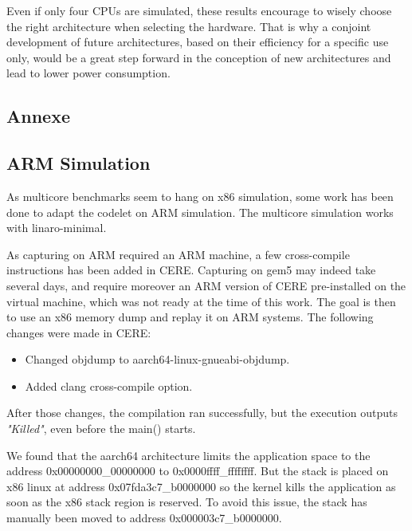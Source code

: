 \documentclass{article}
\begin{document}
\begin{multicols}{2}
Even if only four CPUs are simulated, these results encourage to wisely choose the right architecture when selecting the hardware. That is why a conjoint development of future architectures, based on their efficiency for a specific use only, would be a great step forward in the conception of new architectures and lead to lower power consumption. 


\end{multicols}
\newpage
\begin{multicols}{2}




\end{multicols}
\newpage
\begin{multicols}{2}

\section{Annexe}
\subsection{ARM Simulation}
\label{ARM_sim}
As multicore benchmarks seem to hang on x86 simulation, some work has been done to adapt the codelet on ARM simulation.
The multicore simulation works with linaro-minimal.

As capturing on ARM required an ARM machine, a few cross-compile instructions has been added in CERE. Capturing on gem5 may indeed take several days, and require moreover an ARM version of CERE pre-installed on the virtual machine, which was not ready at the time of this work. The goal is then to use an x86 memory dump and replay it on ARM systems. The following changes were made in CERE:
\begin{itemize}
\item Changed objdump to aarch64-linux-gnueabi-objdump.
\item Added clang cross-compile option.
\end{itemize}

After those changes, the compilation ran successfully, but the execution outputs \textit{"Killed"}, even before the main() starts.


We found that the aarch64 architecture limits the application space to the address 0x00000000\_00000000 to 0x0000ffff\_ffffffff\cite{aarch64-mmu}.
 But the stack is placed on x86 linux at address 0x07fda3c7\_b0000000 so the kernel kills the application as soon as the x86 stack region is reserved.
To avoid this issue, the stack has manually been moved to address 0x000003c7\_b0000000.


\end{multicols}
\end{document}
